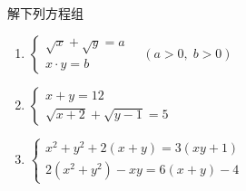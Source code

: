 \begin{example}
    
\end{example}

\begin{example}
    
\end{example}

\begin{example}
    
\end{example}

\begin{example}
    
\end{example}

\begin{example}
    
\end{example}

\begin{example}
    
\end{example}

\begin{example}
    
\end{example}
















\begin{ex}
解下列方程组
\begin{enumerate}
    \item $\begin{cases}
        \sqrt{x}+\sqrt{y}=a\\
        x\cdot y=b
    \end{cases}\quad (a>0,\; b>0)$
    \item $\begin{cases}
        x+y=12\\ \sqrt{x+2}+\sqrt{y-1}=5
    \end{cases}$
    \item $\begin{cases}
        x^2+y^2+2(x+y)=3(xy+1)\\
        2(x^2+y^2)-xy=6(x+y)-4
    \end{cases}$
\end{enumerate}
\end{ex}

